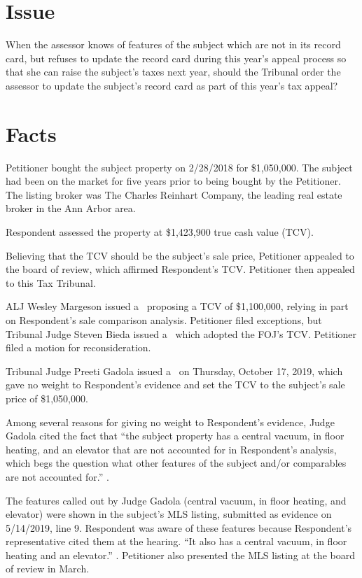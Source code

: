 \documentclass[12pt,\documentclassflag]{michiganCourtOfAppealsBrief}
\begin{document}
\section{Issue}

When the assessor knows of features of the subject which are not in its record card, but refuses to update the record card during this year's appeal process so that she can raise the subject's taxes next year, should the Tribunal order the assessor to update the subject's record card as part of this year's tax appeal?

  
\section{Facts}

Petitioner bought the subject property on 2/28/2018 for \$1,050,000.
The subject had been on the market for five years prior to being bought by the Petitioner. The listing broker was The Charles Reinhart Company, the leading real estate broker in the Ann Arbor area. 

Respondent assessed the property at \$1,423,900 true cash value (TCV).

Believing that the TCV should be the subject's sale price, Petitioner appealed to the board of review, which affirmed Respondent's TCV. Petitioner then appealed to this Tax Tribunal.

ALJ Wesley Margeson issued a \cite{POJ}\ proposing a TCV of \$1,100,000, relying in part on Respondent's sale comparison analysis.
Petitioner filed exceptions, but Tribunal Judge Steven Bieda issued a \cite{FOJ1}\ which adopted the FOJ's TCV.
Petitioner filed a motion for reconsideration.

Tribunal Judge Preeti Gadola issued a \cite{FOJ2}\ on Thursday, October 17, 2019, which gave no weight to Respondent's evidence and set the TCV to the subject's sale price of \$1,050,000.

Among several reasons for giving no weight to Respondent's evidence, Judge Gadola cited the fact that ``the subject property has a central vacuum, in floor heating, and an elevator that are not accounted for in Respondent's analysis, which begs the question what other features of the subject and/or comparables are not accounted for.'' .

The features called out by Judge Gadola (central vacuum, in floor heating, and elevator) were shown in the subject's MLS listing, submitted as evidence on 5/14/2019, line 9. Respondent was aware of these features because Respondent's representative cited them at the hearing. ``It also has a central vacuum, in floor heating and an elevator.'' . Petitioner also presented the MLS listing at the board of review in March.
\end{document}
